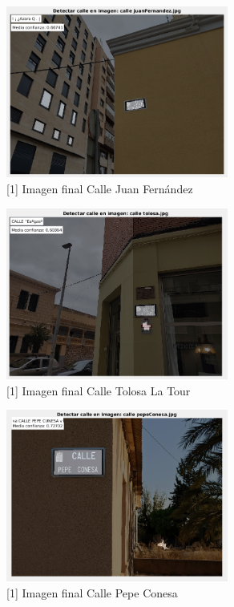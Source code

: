 \documentclass[12pt]{article}
\begin{document}
		\pagebreak
		
		\begin{figure}[h!]
			\begin{center}
				\includegraphics[width=0.65\textwidth]{img/1_7.png}
				\caption{[1] Imagen final Calle Juan Fernández}
			\end{center}
		\end{figure}
		
		\begin{figure}[h!]
			\begin{center}
				\includegraphics[width=0.65\textwidth]{img/1_8.png}
				\caption{[1] Imagen final Calle Tolosa La Tour}
			\end{center}
		\end{figure}
		
		\pagebreak
		
		\begin{figure}[h!]
			\begin{center}
				\includegraphics[width=0.65\textwidth]{img/1_9.png}
				\caption{[1] Imagen final Calle Pepe Conesa}
			\end{center}
		\end{figure}
		
\end{document}
